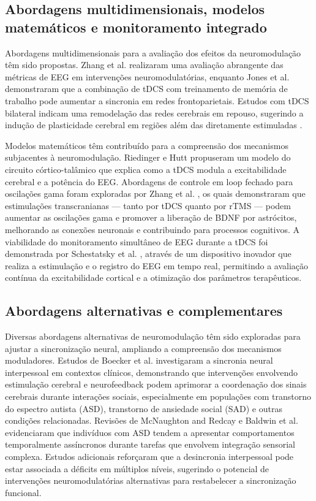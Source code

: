 \subsection{Abordagens multidimensionais, modelos matemáticos e monitoramento integrado}

Abordagens multidimensionais para a avaliação dos efeitos da neuromodulação têm sido propostas. Zhang et al. \cite{zhang2022multidimensional} realizaram uma avaliação abrangente das métricas de EEG em intervenções neuromodulatórias, enquanto Jones et al. \cite{jones2017frontoparietal} demonstraram que a combinação de tDCS com treinamento de memória de trabalho pode aumentar a sincronia em redes frontoparietais. Estudos com tDCS bilateral indicam uma remodelação das redes cerebrais em repouso, sugerindo a indução de plasticidade cerebral em regiões além das diretamente estimuladas \cite{pellegrino2018bilateral}.

Modelos matemáticos têm contribuído para a compreensão dos mecanismos subjacentes à neuromodulação. Riedinger e Hutt \cite{riedinger2022model} propuseram um modelo do circuito córtico-talâmico que explica como a tDCS modula a excitabilidade cerebral e a potência do EEG. Abordagens de controle em loop fechado para oscilações gama foram exploradas por Zhang et al. \cite{zhang2024closed}, os quais demonstraram que estimulações transcranianas — tanto por tDCS quanto por rTMS — podem aumentar as oscilações gama e promover a liberação de BDNF por astrócitos, melhorando as conexões neuronais e contribuindo para processos cognitivos. A viabilidade do monitoramento simultâneo de EEG durante a tDCS foi demonstrada por Schestatsky et al. \cite{schestatsky2013simultaneous}, através de um dispositivo inovador que realiza a estimulação e o registro do EEG em tempo real, permitindo a avaliação contínua da excitabilidade cortical e a otimização dos parâmetros terapêuticos.

\subsection{Abordagens alternativas e complementares}

Diversas abordagens alternativas de neuromodulação têm sido exploradas para ajustar a sincronização neural, ampliando a compreensão dos mecanismos moduladores. Estudos de Boecker et al. \cite{boecker2024interpersonal} investigaram a sincronia neural interpessoal em contextos clínicos, demonstrando que intervenções envolvendo estimulação cerebral e neurofeedback podem aprimorar a coordenação dos sinais cerebrais durante interações sociais, especialmente em populações com transtorno do espectro autista (ASD), transtorno de ansiedade social (SAD) e outras condições relacionadas. Revisões de McNaughton and Redcay \cite{McNaughton2020} e Baldwin et al. \cite{Baldwin2022} evidenciaram que indivíduos com ASD tendem a apresentar comportamentos temporalmente assíncronos durante tarefas que envolvem integração sensorial complexa. Estudos adicionais \cite{Gerloff2022a, QuinonesCamacho2021, Key2022, Tanabe2012} reforçaram que a desincronia interpessoal pode estar associada a déficits em múltiplos níveis, sugerindo o potencial de intervenções neuromodulatórias alternativas para restabelecer a sincronização funcional.

